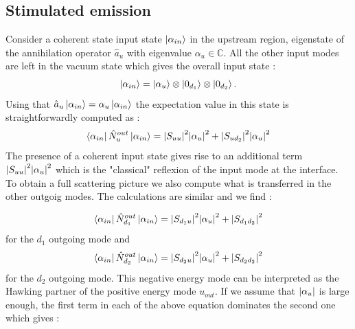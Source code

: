 \subsection{Stimulated emission}

Consider a coherent state input state $\ket{\alpha_{in}}$ in the upstream region, eigenstate of the annihilation operator $\hat{a}_u$ with eigenvalue $\alpha_u \in \mathbb{C}$. All the other 
input modes are left in the vacuum state which gives the overall input state :
\begin{equation}
    \ket{\alpha_{in}}=\ket{\alpha_u}\otimes\ket{0_{d_1}}\otimes\ket{0_{d_2}}.
\end{equation}
Using that $\hat{a}_u\ket{\alpha_{in}}=\alpha_u\ket{\alpha_{in}}$ the expectation value in this state is straightforwardly computed as :
\begin{equation}
    \bra{\alpha_{in}}\hat{N}_u^{out}\ket{\alpha_{in}} = \abs{S_{uu}}^2\abs{\alpha_u}^2 + \abs{S_{ud_2}}^2\abs{\alpha_u}^2
    \label{eq:stimulated_expectation_value}
\end{equation}
The presence of a coherent input state gives rise to an additional term $\abs{S_{uu}}^2\abs{\alpha_u}^2$ which is the "classical" reflexion of the input mode at the interface.
To obtain a full scattering picture we also compute what is transferred in the other outgoig modes. The calculations are similar and we find :

\begin{equation}
    \bra{\alpha_{in}}\hat{N}_{d_1}^{out}\ket{\alpha_{in}} = \abs{S_{d_1u}}^2\abs{\alpha_u}^2 + \abs{S_{d_1d_2}}^2
    \label{eq:d1_stimulated_expectation_value}
\end{equation}
for the $d_1$ outgoing mode and 
\begin{equation}
    \bra{\alpha_{in}}\hat{N}_{d_2}^{out}\ket{\alpha_{in}} = \abs{S_{d_2u}}^2\abs{\alpha_u}^2 + \abs{S_{d_2d_2}}^2
    \label{eq:d2_stimulated_expectation_value}
\end{equation}
for the $d_2$ outgoing mode. This negative energy mode can be interpreted as the Hawking partner of the positive energy mode $u_{out}$.
If we assume that $\abs{\alpha_u}$ is large enough, the first term in each of the above equation dominates the second one which gives :


